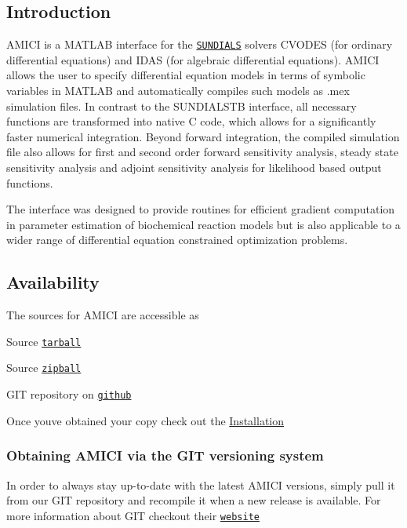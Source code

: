 \hypertarget{index_intro}{}\subsection{Introduction}\label{index_intro}
A\+M\+I\+C\+I is a M\+A\+T\+L\+A\+B interface for the \href{https://computation.llnl.gov/casc/sundials/main.html}{\tt S\+U\+N\+D\+I\+A\+L\+S} solvers C\+V\+O\+D\+E\+S (for ordinary differential equations) and I\+D\+A\+S (for algebraic differential equations). A\+M\+I\+C\+I allows the user to specify differential equation models in terms of symbolic variables in M\+A\+T\+L\+A\+B and automatically compiles such models as .mex simulation files. In contrast to the S\+U\+N\+D\+I\+A\+L\+S\+T\+B interface, all necessary functions are transformed into native C code, which allows for a significantly faster numerical integration. Beyond forward integration, the compiled simulation file also allows for first and second order forward sensitivity analysis, steady state sensitivity analysis and adjoint sensitivity analysis for likelihood based output functions.

The interface was designed to provide routines for efficient gradient computation in parameter estimation of biochemical reaction models but is also applicable to a wider range of differential equation constrained optimization problems.\hypertarget{index_download}{}\subsection{Availability}\label{index_download}
The sources for A\+M\+I\+C\+I are accessible as
\begin{DoxyItemize}
\item Source \href{https://github.com/FFroehlich/AMICI/tarball/master}{\tt tarball}
\item Source \href{https://github.com/FFroehlich/AMICI/zipball/master}{\tt zipball}
\item G\+I\+T repository on \href{https://github.com/FFroehlich/AMICI}{\tt github}
\end{DoxyItemize}

Once you\textquotesingle{}ve obtained your copy check out the \hyperlink{index_install}{Installation}\hypertarget{index_git}{}\subsubsection{Obtaining A\+M\+I\+C\+I via the G\+I\+T versioning system}\label{index_git}
In order to always stay up-\/to-\/date with the latest A\+M\+I\+C\+I versions, simply pull it from our G\+I\+T repository and recompile it when a new release is available. For more information about G\+I\+T checkout their \href{http://git-scm.com/}{\tt website}

